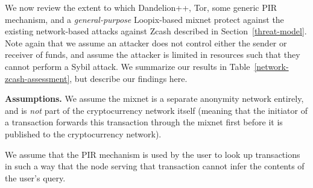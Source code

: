 \documentclass{article}
\begin{document}
We now review the extent to which Dandelion++, Tor, some generic PIR mechanism,
and a \emph{general-purpose} Loopix-based mixnet
protect against the existing network-based attacks against Zcash described in
Section~\ref{threat-model}.
Note again that we assume an attacker does not control either the sender or receiver
of funds, and assume the attacker is limited in resources such that they cannot
perform a Sybil attack.
We summarize our results in Table~\ref{network-zcash-assessment}, but describe
our findings here.

\textbf{Assumptions.} We assume the mixnet is a separate anonymity network
entirely, and is \emph{not} part of the cryptocurrency network
itself (meaning that the initiator of a transaction forwards this transaction
through the mixnet first before it is published to the cryptocurrency network).

We assume that the PIR mechanism is used by the user to look up transactions in
such a way that the node serving that transaction cannot infer the contents of
the user's query.
\end{document}

